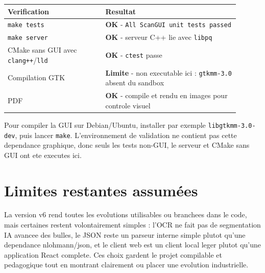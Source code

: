 \documentclass[11pt,a4paper]{article}
\newcommand{\ok}{\textcolor{sggreen}{\textbf{OK}}}
\newcommand{\limit}{\textcolor{sgorange}{\textbf{Limite}}}
\begin{document}
\begin{longtable}{p{0.38\linewidth}p{0.52\linewidth}}
\toprule
Verification & Resultat \\
\midrule
\texttt{make tests} & \ok{} - \texttt{All ScanGUI unit tests passed} \\
\texttt{make server} & \ok{} - serveur C++ lie avec \texttt{libpq} \\
CMake sans GUI avec \texttt{clang++}/\texttt{lld} & \ok{} - \texttt{ctest} passe \\
Compilation GTK & \limit{} - non executable ici : \texttt{gtkmm-3.0} absent du sandbox \\
PDF & \ok{} - compile et rendu en images pour controle visuel \\
\bottomrule
\end{longtable}
\begin{warningbox}
Pour compiler la GUI sur Debian/Ubuntu, installer par exemple \texttt{libgtkmm-3.0-dev}, puis lancer \texttt{make}. L'environnement de validation ne contient pas cette dependance graphique, donc seuls les tests non-GUI, le serveur et CMake sans GUI ont ete executes ici.
\end{warningbox}
\section{Limites restantes assumées}
La version v6 rend toutes les evolutions utilisables ou branchees dans le code, mais certaines restent volontairement simples : l'OCR ne fait pas de segmentation IA avancee des bulles, le JSON reste un parseur interne simple plutot qu'une dependance nlohmann/json, et le client web est un client local leger plutot qu'une application React complete. Ces choix gardent le projet compilable et pedagogique tout en montrant clairement ou placer une evolution industrielle.
\end{document}
